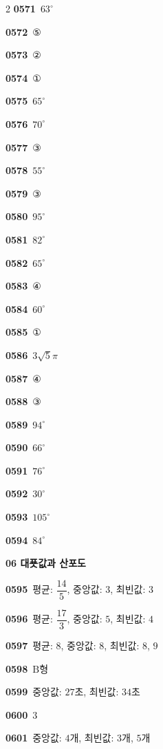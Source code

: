\documentclass[10pt,a4paper]{article}
\newcommand{\pt}[1]{\mathrm{#1}}
\begin{document}
\begin{multicols}{2}
\noindent\textbf{0571}\ $63^\circ$\par
\noindent\textbf{0572}\ ⑤\par
\noindent\textbf{0573}\ ②\par
\noindent\textbf{0574}\ ①\par
\noindent\textbf{0575}\ $65^\circ$\par
\noindent\textbf{0576}\ $70^\circ$\par
\noindent\textbf{0577}\ ③\par
\noindent\textbf{0578}\ $55^\circ$\par
\noindent\textbf{0579}\ ③\par
\noindent\textbf{0580}\ $95^\circ$\par
\noindent\textbf{0581}\ $82^\circ$\par
\noindent\textbf{0582}\ $65^\circ$\par
\noindent\textbf{0583}\ ④\par
\noindent\textbf{0584}\ $60^\circ$\par
\noindent\textbf{0585}\ ①\par
\noindent\textbf{0586}\ $3\sqrt{5}\pi$\par
\noindent\textbf{0587}\ ④\par
\noindent\textbf{0588}\ ③\par
\noindent\textbf{0589}\ $94^\circ$\par
\noindent\textbf{0590}\ $66^\circ$\par
\noindent\textbf{0591}\ $76^\circ$\par
\noindent\textbf{0592}\ $30^\circ$\par
\noindent\textbf{0593}\ $105^\circ$\par
\noindent\textbf{0594}\ $84^\circ$\par
\noindent\textbf{06 대푯값과 산포도}\par\smallskip
\noindent\textbf{0595}\ 평균: $\dfrac{14}{5}$, 중앙값: $3$, 최빈값: $3$\par
\noindent\textbf{0596}\ 평균: $\dfrac{17}{3}$, 중앙값: $5$, 최빈값: $4$\par
\noindent\textbf{0597}\ 평균: $8$, 중앙값: $8$, 최빈값: $8$, $9$\par
\noindent\textbf{0598}\ $\pt{B}$형\par
\noindent\textbf{0599}\ 중앙값: $27$초, 최빈값: $34$초\par
\noindent\textbf{0600}\ $3$\par
\noindent\textbf{0601}\ 중앙값: $4$개, 최빈값: $3$개, $5$개\par

\end{multicols}
\end{document}
